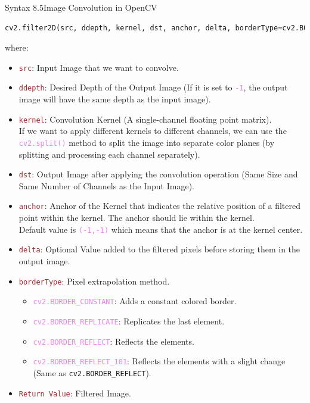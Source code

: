 \documentclass{book}
\begin{document}
\begin{synBox}{Syntax 8.5}{Image Convolution in OpenCV}
    \raggedright
    \begin{lstlisting}[language=Python, basicstyle=\ttfamily\small, keywordstyle=\color{blue}, commentstyle=\color{forestgreen}, stringstyle=\color{red}, showstringspaces=false]
        cv2.filter2D(src, ddepth, kernel, dst, anchor, delta, borderType=cv2.BORDER_DEFAULT)
    \end{lstlisting}
    where:
    \begin{itemize}
        \item \textcolor{brown}{\texttt{src}}: Input Image that we want to convolve.
        \item \textcolor{brown}{\texttt{ddepth}}: Desired Depth of the Output Image (If it is set to \textcolor{violet}{\texttt{-1}}, the output image will have the same depth as the input image).
        \item \textcolor{brown}{\texttt{kernel}}: Convolution Kernel (A single-channel floating point matrix).\\
        If we want to apply different kernels to different channels, we can use the \textcolor{violet}{\texttt{cv2.split()}} method to split the image into separate color planes (by splitting and processing each channel separately).
        \item \textcolor{brown}{\texttt{dst}}: Output Image after applying the convolution operation (Same Size and Same Number of Channels as the Input Image).
        \item \textcolor{brown}{\texttt{anchor}}: Anchor of the Kernel that indicates the relative position of a filtered point within the kernel. The anchor should lie within the kernel.\\
        Default value is \textcolor{violet}{\texttt{(-1,-1)}} which means that the anchor is at the kernel center.
        \item \textcolor{brown}{\texttt{delta}}: Optional Value added to the filtered pixels before storing them in the output image.
        \item \textcolor{brown}{\texttt{borderType}}: Pixel extrapolation method.
        \begin{itemize}
            \item \textcolor{violet}{\texttt{cv2.BORDER\_CONSTANT}}: Adds a constant colored border.
            \item \textcolor{violet}{\texttt{cv2.BORDER\_REPLICATE}}: Replicates the last element.
            \item \textcolor{violet}{\texttt{cv2.BORDER\_REFLECT}}: Reflects the elements.
            \item \textcolor{violet}{\texttt{cv2.BORDER\_REFLECT\_101}}: Reflects the elements with a slight change (Same as \texttt{cv2.BORDER\_REFLECT}).
        \end{itemize}
        \item \textcolor{brown}{\texttt{Return Value}}: Filtered Image.
    \end{itemize}
\end{synBox}
\end{document}
